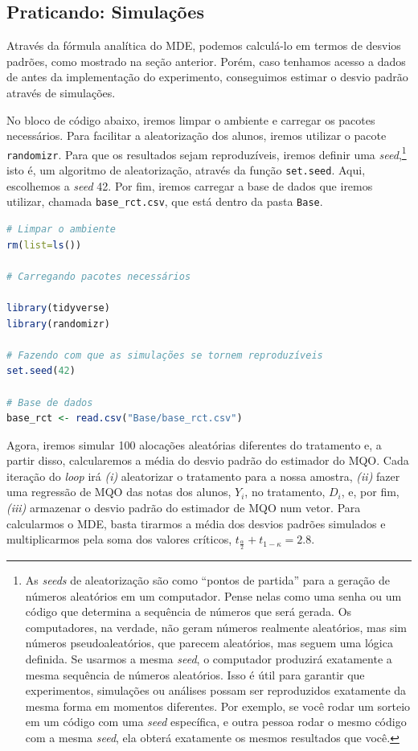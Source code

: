 \subsection{\sc Praticando: Simulações}

Através da fórmula analítica do MDE, podemos calculá-lo em termos de desvios padrões, como mostrado na seção anterior. Porém, caso tenhamos acesso a dados de antes da implementação do experimento, conseguimos estimar o desvio padrão através de simulações.

No bloco de código abaixo, iremos limpar o ambiente e carregar os pacotes necessários. Para facilitar a aleatorização dos alunos, iremos utilizar o pacote \texttt{randomizr}.  Para que os resultados sejam reproduzíveis, iremos definir uma \textit{seed},\footnote{As \textit{seeds} de aleatorização são como ``pontos de partida'' para a geração de números aleatórios em um computador. Pense nelas como uma senha ou um código que determina a sequência de números que será gerada. Os computadores, na verdade, não geram números realmente aleatórios, mas sim números pseudoaleatórios, que parecem aleatórios, mas seguem uma lógica definida. Se usarmos a mesma \textit{seed}, o computador produzirá exatamente a mesma sequência de números aleatórios. Isso é útil para garantir que experimentos, simulações ou análises possam ser reproduzidos exatamente da mesma forma em momentos diferentes. Por exemplo, se você rodar um sorteio em um código com uma \textit{seed} específica, e outra pessoa rodar o mesmo código com a mesma \textit{seed}, ela obterá exatamente os mesmos resultados que você.} isto é, um algoritmo de aleatorização, através da função \texttt{set.seed}. Aqui, escolhemos a \textit{seed} 42. Por fim, iremos carregar a base de dados que iremos utilizar, chamada \texttt{base\_rct.csv}, que está dentro da pasta \texttt{Base}.

\begin{boxH}
\begin{lstlisting}[language = R]
# Limpar o ambiente 
rm(list=ls())

# Carregando pacotes necessários

library(tidyverse)
library(randomizr)

# Fazendo com que as simulações se tornem reproduzíveis
set.seed(42)

# Base de dados
base_rct <- read.csv("Base/base_rct.csv")
\end{lstlisting}
\end{boxH}

Agora, iremos simular 100 alocações aleatórias diferentes do tratamento e, a partir disso, calcularemos a média do desvio padrão do estimador do MQO. Cada iteração do \textit{loop} irá \textit{(i)} aleatorizar o tratamento para a nossa amostra, \textit{(ii)} fazer uma regressão de MQO das notas dos alunos, $Y_i$, no tratamento, $D_i$, e, por fim, \textit{(iii)} armazenar o desvio padrão do estimador de MQO num vetor. Para calcularmos o MDE, basta tirarmos a média dos desvios padrões simulados e multiplicarmos pela soma dos valores críticos, $t_{\frac{\alpha}{2}} + t_{1-\kappa} = 2.8$.

